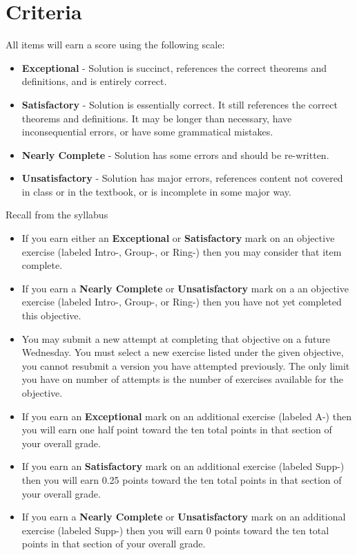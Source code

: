 \documentclass[12pt]{article}
\begin{document}
	\section*{Criteria}
	All items will earn a score using the following scale:
	\begin{itemize}
		\item \textbf{Exceptional} - Solution is succinct, references the correct theorems and definitions, and is entirely correct.
		\item \textbf{Satisfactory} - Solution is essentially correct. It still references the correct theorems and definitions. 
		It may be longer than necessary, have inconsequential errors, or have some grammatical mistakes.
		\item \textbf{Nearly Complete} - Solution has some errors and should be re-written.
		\item \textbf{Unsatisfactory} - Solution has major errors, references content not covered in class or in the textbook, or is incomplete in some major way.
	\end{itemize}
	Recall from the syllabus
	\begin{itemize}
		\item If you earn either an \textbf{Exceptional} or \textbf{Satisfactory} mark on an objective exercise (labeled Intro-, Group-, or Ring-) then you may consider that item complete. 
		\item If you earn a \textbf{Nearly Complete} or \textbf{Unsatisfactory} mark on a an objective exercise (labeled Intro-, Group-, or Ring-) then you have not yet completed this objective.
		\item You may submit a new attempt at completing that objective on a future Wednesday. You must select a new exercise listed under the given objective, you cannot resubmit a version you have attempted previously.  The only limit you have on number of attempts is the number of exercises available for the objective.
		\item If you earn an \textbf{Exceptional} mark on an additional exercise (labeled A-) then you will earn one half point toward the ten total points in that section of your overall grade.
		\item If you earn an \textbf{Satisfactory} mark on an additional exercise (labeled Supp-) then you will earn 0.25 points toward the ten total points in that section of your overall grade. 
		\item If you earn a \textbf{Nearly Complete} or \textbf{Unsatisfactory} mark on an additional exercise (labeled Supp-) then you will earn 0 points toward the ten total points in that section of your overall grade. 
	\end{itemize}
	
\end{document}
